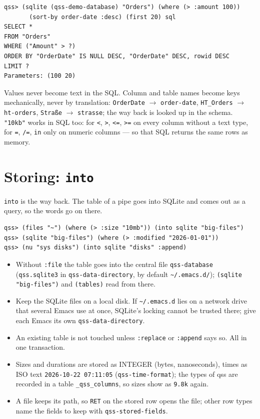 \documentclass[
  paper=a4, fontsize=11pt, parskip=half, headings=small,
  toc=bibliography, numbers=noenddot, DIV=12
]{scrreprt}
\newcommand{\code}[1]{\texttt{#1}}
\newcommand{\file}[1]{\texttt{#1}}
\newcommand{\kbd}[1]{\texttt{#1}}
\newcommand{\qss}{\textsf{qss}}
\begin{document}
\begin{Verbatim}
qss> (sqlite (qss-demo-database) "Orders") (where (> :amount 100))
       (sort-by order-date :desc) (first 20) sql
SELECT *
FROM "Orders"
WHERE ("Amount" > ?)
ORDER BY "OrderDate" IS NULL DESC, "OrderDate" DESC, rowid DESC
LIMIT ?
Parameters: (100 20)
\end{Verbatim}

Values never become text in the SQL. Column and table names become keys
mechanically, never by translation: \code{OrderDate} $\to$ \code{order-date},
\code{HT\_Orders} $\to$ \code{ht-orders}, \code{Straße} $\to$ \code{strasse}; the
way back is looked up in the schema. \code{"10kb"} works in SQL too: for
\code{<}, \code{>}, \code{<=}, \code{>=} on every column without a text type,
for \code{=}, \code{/=}, \code{in} only on numeric columns --- so that SQL
returns the same rows as memory.

\section{Storing: \texttt{into}}\label{sec:into}

\code{into} is the way back. The table of a pipe goes into SQLite and comes out
as a query, so the words go on there.

\begin{Verbatim}
qss> (files "~") (where (> :size "10mb")) (into sqlite "big-files")
qss> (sqlite "big-files") (where (> :modified "2026-01-01"))
qss> (nu "sys disks") (into sqlite "disks" :append)
\end{Verbatim}

\begin{itemize}
\item Without \code{:file} the table goes into the central file
  \code{qss-database} (\file{qss.sqlite3} in \code{qss-data-directory},
  by default \file{\textasciitilde/.emacs.d/}); \code{(sqlite "big-files")}
  and \code{(tables)} read from there.
\item Keep the SQLite files on a local disk. If \file{\textasciitilde/.emacs.d}
  lies on a network drive that several Emacs use at once, SQLite's locking
  cannot be trusted there; give each Emacs its own \code{qss-data-directory}.
\item An existing table is not touched unless \code{:replace} or
  \code{:append} says so. All in one transaction.
\item Sizes and durations are stored as INTEGER (bytes, nanoseconds), times as
  ISO text \code{2026-10-22 07:11:05} (\code{qss-time-format}); the types of
  \qss{} are recorded in a table \code{\_qss\_columns}, so sizes show as
  \code{9.8k} again.
\item A file keeps its path, so \kbd{RET} on the stored row opens the file;
  other row types name the fields to keep with \code{qss-stored-fields}.
\end{itemize}
\end{document}
